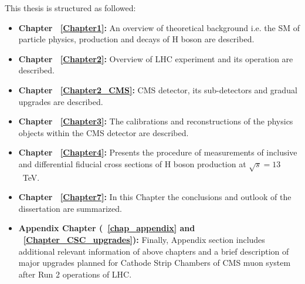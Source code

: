 \par This thesis is structured as followed:
\begin{itemize}
	\item \textbf{Chapter  ~\ref{Chapter1}:  } An overview of theoretical background i.e. the SM of particle physics, production and decays of H boson are described.%
	\item \textbf{Chapter ~\ref{Chapter2}: } Overview of LHC experiment and its operation are described. 
	\item \textbf{Chapter ~\ref{Chapter2_CMS}: } CMS detector, its sub-detectors and gradual upgrades are described. %
	\item \textbf{Chapter ~\ref{Chapter3}: } The calibrations and reconstructions of the  physics objects within the CMS detector are described. %
        \item \textbf{Chapter ~\ref{Chapter4}: } Presents the procedure of measurements of inclusive and differential fiducial cross sections of H boson production at $\sqrt{s} = 13$~TeV.
	\item \textbf{Chapter ~\ref{Chapter7}: } In this Chapter the conclusions and outlook of the dissertation are summarized.
	\item \textbf{Appendix Chapter (~\ref{chap_appendix} and ~\ref{Chapter_CSC_upgrades}): } Finally, Appendix section includes additional relevant information of above chapters and a brief description of major upgrades planned for Cathode Strip Chambers of CMS muon system after Run 2 operations of LHC. 
\end{itemize}
		

